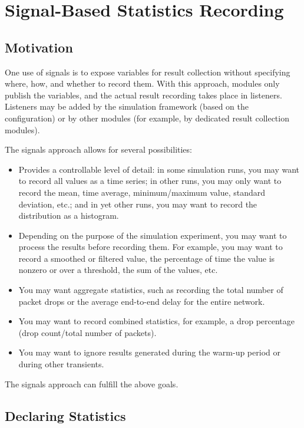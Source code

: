 \section{Signal-Based Statistics Recording}
\label{sec:simple-modules:signal-based-statistics}

\subsection{Motivation}
\label{sec:simple-modules:signal-based-statistics-motivation}

One use of signals is to expose variables for result collection without
specifying where, how, and whether to record them. With this approach,
modules only publish the variables, and the actual result recording
takes place in listeners. Listeners may be added by the simulation
framework (based on the configuration) or by other modules (for example,
by dedicated result collection modules).

The signals approach allows for several possibilities:

\begin{itemize}
 \item Provides a controllable level of detail: in some simulation runs,
    you may want to record all values as a time series; in other runs,
    you may only want to record the mean, time average, minimum/maximum
    value, standard deviation, etc.; and in yet other runs,
    you may want to record the distribution as a histogram.
 \item Depending on the purpose of the simulation experiment, you may want
    to process the results before recording them. For example,
    you may want to record a smoothed or filtered value, the percentage
    of time the value is nonzero or over a threshold, the sum of the values,
    etc.
 \item You may want aggregate statistics, such as recording the total number
    of packet drops or the average end-to-end delay for the entire network.
 \item You may want to record combined statistics, for example, a drop
    percentage (drop count/total number of packets).
 \item You may want to ignore results generated during the warm-up period
    or during other transients.
\end{itemize}

The signals approach can fulfill the above goals.


\subsection{Declaring Statistics}
\label{sec:simple-modules:declaring-statistics}

